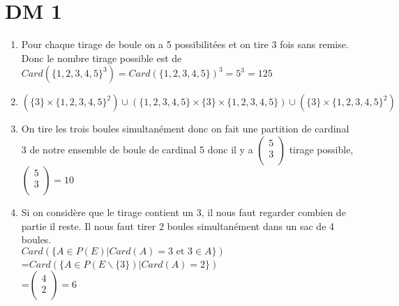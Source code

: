 \documentclass{article}
\author{Frederic Becerril}
\begin{document}
\part*{DM 1}

\begin{enumerate}
    \item Pour chaque tirage de boule on a 5 possibilitées et on tire 3 fois sans remise. Donc le nombre tirage possible est de $Card(\{1, 2, 3, 4 ,5\}^3) = Card(\{1, 2, 3, 4, 5\})^3 = 5^3 = 125$
    \item $(\{3\} \times \{1, 2, 3, 4 ,5\}^2) \cup (\{1, 2, 3, 4 ,5\} \times \{3\} \times \{1, 2, 3, 4 ,5\}) \cup (\{3\} \times \{1, 2, 3, 4 ,5\}^2)$
    \item On tire les trois boules simultanément donc on fait une partition de cardinal 3 de notre ensemble de boule de cardinal 5 donc il y a $\begin{pmatrix}
        5\\
        3\\
    \end{pmatrix}$ tirage possible, $\begin{pmatrix}
        5\\
        3\\
    \end{pmatrix} = 10$
    \item Si on considère que le tirage contient un 3, il nous faut regarder combien de partie il reste. Il nous faut tirer 2 boules simultanément dans un sac de 4 boules.\\
$Card(\{A \in P(E) | Card(A) = 3 \mbox{ et } 3 \in A\})$\\
=$Card(\{A \in P(E \backslash \{3\}) | Card(A) = 2\})$\\
=$\begin{pmatrix}
    4\\
    2\\
\end{pmatrix} = 6$
\end{enumerate}
\end{document}

